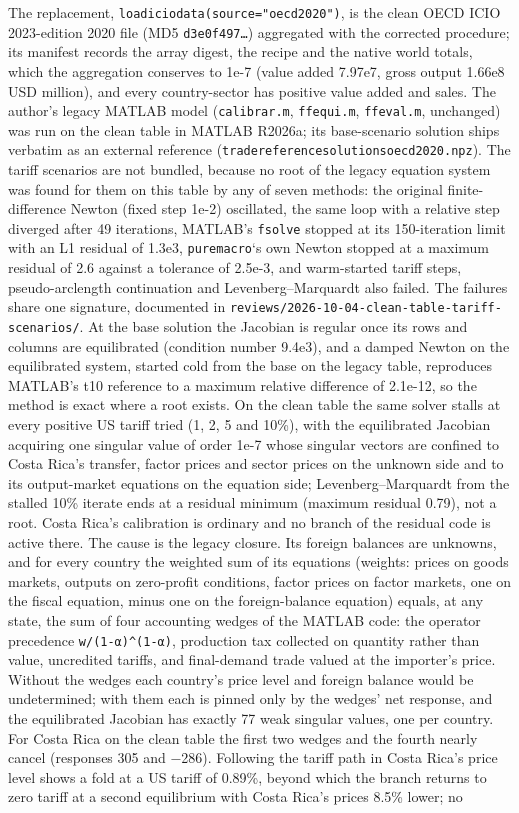 \documentclass[11pt,letterpaper]{article}
\renewcommand{\_}{\pmunderscore\allowbreak}
\begin{document}
The replacement, \texttt{load\_icio\_data(source="oecd2020")}, is the clean OECD ICIO 2023-edition 2020 file (MD5 \texttt{d3e0f497…}) aggregated with the corrected procedure; its manifest records the array digest, the recipe and the native world totals, which the aggregation conserves to 1e-7 (value added 7.97e7, gross output 1.66e8 USD million), and every country-sector has positive value added and sales. The author's legacy MATLAB model (\texttt{calibrar.m}, \texttt{ff\_equi.m}, \texttt{ff\_eval.m}, unchanged) was run on the clean table in MATLAB R2026a; its base-scenario solution ships verbatim as an external reference (\texttt{trade\_reference\_solutions\_oecd2020.npz}). The tariff scenarios are not bundled, because no root of the legacy equation system was found for them on this table by any of seven methods: the original finite-difference Newton (fixed step 1e-2) oscillated, the same loop with a relative step diverged after 49 iterations, MATLAB's \texttt{fsolve} stopped at its 150-iteration limit with an L1 residual of 1.3e3, \texttt{puremacro}`s own Newton stopped at a maximum residual of 2.6 against a tolerance of 2.5e-3, and warm-started tariff steps, pseudo-arclength continuation and Levenberg--Marquardt also failed. The failures share one signature, documented in \texttt{reviews/2026-10-04-clean-table-tariff-scenarios/}. At the base solution the Jacobian is regular once its rows and columns are equilibrated (condition number 9.4e3), and a damped Newton on the equilibrated system, started cold from the base on the legacy table, reproduces MATLAB's t10 reference to a maximum relative difference of 2.1e-12, so the method is exact where a root exists. On the clean table the same solver stalls at every positive US tariff tried (1, 2, 5 and 10\%), with the equilibrated Jacobian acquiring one singular value of order 1e-7 whose singular vectors are confined to Costa Rica's transfer, factor prices and sector prices on the unknown side and to its output-market equations on the equation side; Levenberg--Marquardt from the stalled 10\% iterate ends at a residual minimum (maximum residual 0.79), not a root. Costa Rica's calibration is ordinary and no branch of the residual code is active there. The cause is the legacy closure. Its foreign balances are unknowns, and for every country the weighted sum of its equations (weights: prices on goods markets, outputs on zero-profit conditions, factor prices on factor markets, one on the fiscal equation, minus one on the foreign-balance equation) equals, at any state, the sum of four accounting wedges of the MATLAB code: the operator precedence \texttt{w/(1-α)\^{}(1-α)}, production tax collected on quantity rather than value, uncredited tariffs, and final-demand trade valued at the importer's price. Without the wedges each country's price level and foreign balance would be undetermined; with them each is pinned only by the wedges' net response, and the equilibrated Jacobian has exactly 77 weak singular values, one per country. For Costa Rica on the clean table the first two wedges and the fourth nearly cancel (responses 305 and −286). Following the tariff path in Costa Rica's price level shows a fold at a US tariff of 0.89\%, beyond which the branch returns to zero tariff at a second equilibrium with Costa Rica's prices 8.5\% lower; no 
\end{document}
